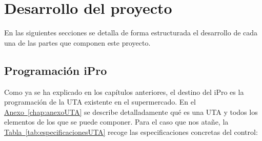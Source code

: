 
\cleardoublepage
\chapter{Desarrollo del proyecto}

\label{chap:desarrolloProyecto} %

En las siguientes secciones se detalla de forma estructurada el desarrollo de cada una de las partes que componen este proyecto.


\section{Programación iPro}
\label{sec:programacionipro}
Como ya se ha explicado en los capítulos anteriores, el destino del iPro es la programación de la UTA existente en el supermercado. En el \hyperref[chap:anexoUTA]{Anexo~\ref{chap:anexoUTA}} se describe detalladamente qué es una UTA y todos los elementos de los que se puede componer. Para el caso que nos atañe, la \hyperref[tab:especificacionesUTA]{Tabla~\ref{tab:especificacionesUTA}} recoge las especificaciones concretas del control:

